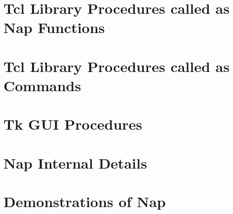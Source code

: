 \documentclass[a4paper]{book}
\begin{document}
\chapter{Tcl Library Procedures called as Nap Functions}
    
    
    
    
    
\chapter{Tcl Library Procedures called as Commands}
    
    
    
    
    
    
\chapter{Tk GUI Procedures}
    
    
    
    
\chapter{Nap Internal Details}
    
    
\chapter{Demonstrations of Nap}
    
    
    
    
    
    
    
    
    
    
    
    
\end{document}

